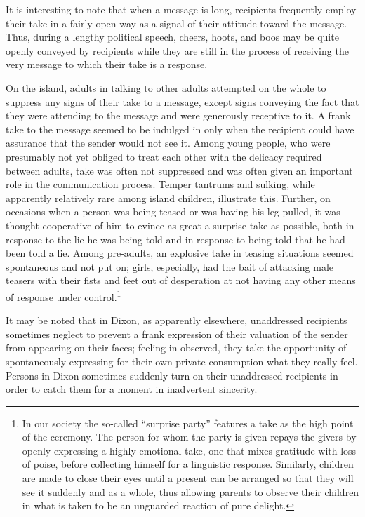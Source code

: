 \documentclass[twoside,symmetric,nobib,justified]{tufte-book}
\begin{document}
It is interesting to note that when a message is long, recipients
frequently employ their take in a fairly open way as a signal of their
attitude toward the message. Thus, during a lengthy political speech,
cheers, hoots, and boos may be quite openly conveyed by recipients while
they are still in the process of receiving the very message to which
their take is a response.

On the island, adults in talking to other adults attempted on the whole
to suppress any signs of their take to a message, except signs conveying
the fact that they were attending to the message and were generously
receptive to it. A frank take to the message seemed to be indulged in
only when the recipient could have assurance that the sender would not
see it. Among young people, who were presumably not yet obliged to treat
each other with the delicacy required between adults, take was often not
suppressed and was often given an important role in the communication
process. Temper tantrums and sulking, while apparently relatively rare
among island children, illustrate this. Further, on occasions when a
person was being teased or was having his leg pulled, it was thought
cooperative of him to evince as great a surprise take as possible, both
in response to the lie he was being told and in response to being told
that he had been told a lie. Among pre-adults, an explosive take in
teasing situations seemed spontaneous and not put on; girls, especially,
had the bait of attacking male teasers with their fists and feet out of
desperation at not having any other means of response under
control.\footnote{In our society the so-called ``surprise party''
  features a take as the high point of the ceremony. The person for whom
  the party is given repays the givers by openly expressing a highly
  emotional take, one that mixes gratitude with loss of poise, before
  collecting himself for a linguistic response. Similarly, children are
  made to close their eyes until a present can be arranged so that they
  will see it suddenly and as a whole, thus allowing parents to observe
  their children in what is taken to be an unguarded reaction of pure
  delight.}

It may be noted that in Dixon, as apparently elsewhere, unaddressed
recipients sometimes neglect to prevent a frank expression of their
valuation of the sender from appearing on their faces; feeling in
observed, they take the opportunity of spontaneously expressing for
their own private consumption what they really feel. Persons in Dixon
sometimes suddenly turn on their unaddressed recipients in order to
catch them for a moment in inadvertent sincerity.
\end{document}
